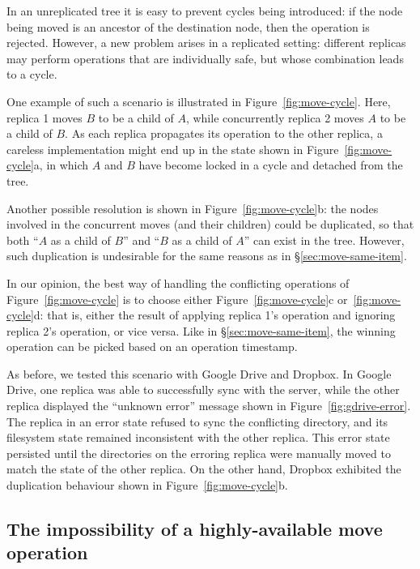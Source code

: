 \documentclass[sigplan,anonymous]{acmart}
\begin{document}
In an unreplicated tree it is easy to prevent cycles being introduced: if the node being moved is an ancestor of the destination node, then the operation is rejected.
However, a new problem arises in a replicated setting: different replicas may perform operations that are individually safe, but whose combination leads to a cycle.

One example of such a scenario is illustrated in Figure~\ref{fig:move-cycle}.
Here, replica 1 moves $B$ to be a child of $A$, while concurrently replica 2 moves $A$ to be a child of $B$.
As each replica propagates its operation to the other replica, a careless implementation might end up in the state shown in Figure~\ref{fig:move-cycle}a, in which $A$ and $B$ have become locked in a cycle and detached from the tree.

Another possible resolution is shown in Figure~\ref{fig:move-cycle}b: the nodes involved in the concurrent moves (and their children) could be duplicated, so that both ``$A$ as a child of $B$'' and ``$B$ as a child of $A$'' can exist in the tree.
However, such duplication is undesirable for the same reasons as in \S\ref{sec:move-same-item}.

In our opinion, the best way of handling the conflicting operations of Figure~\ref{fig:move-cycle} is to choose either Figure~\ref{fig:move-cycle}c or~\ref{fig:move-cycle}d: that is, either the result of applying replica 1's operation and ignoring replica 2's operation, or vice versa.
Like in \S\ref{sec:move-same-item}, the winning operation can be picked based on an operation timestamp.

As before, we tested this scenario with Google Drive and Dropbox.
In Google Drive, one replica was able to successfully sync with the server, while the other replica displayed the ``unknown error'' message shown in Figure~\ref{fig:gdrive-error}.
The replica in an error state refused to sync the conflicting directory, and its filesystem state remained inconsistent with the other replica.
This error state persisted until the directories on the erroring replica were manually moved to match the state of the other replica.
On the other hand, Dropbox exhibited the duplication behaviour shown in Figure~\ref{fig:move-cycle}b.

\subsection{The impossibility of a highly-available move operation}\label{sec:impossibility}
\end{document}
